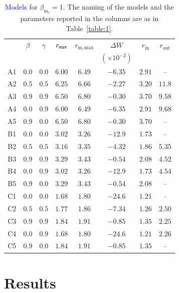 \documentclass{aa}
\newcommand{\sg}[1]{\textcolor{blue}{#1}}
\begin{document}
\begin{table}
\caption{\sg{Models} for $\beta_{\mathrm{m}_{\mathrm{c}}} = 1$. The naming of the models and the parameters reported in the columns are as in Table~\ref{table:1}.}             
\label{table:2}      
\centering          
\begin{tabular}{c c c c  c c c c}
\hline\hline       
 & $\beta$ & $\gamma$ & $r_{\rm{max}}$ &  $r_{\mathrm{m, max}}$ & $\Delta W$               & $r_{\mathrm{in}}$ & $r_{\mathrm{out}}$ \\ 
 &              &                   &                          &                                        & $(\times 10^{-2})$     &                              &  \\
\hline           
A1 & $0.0$ & $0.0$ & $6.00$ &  $6.49$  & $-6.35$ & $2.91$ & -- \\ 
A2 & $0.5$ & $0.5$ & $6.25$ &  $6.66$  & $-2.27$ & $3.20$ & $11.8$\\ 
A3 & $0.9$ & $0.9$ & $6.50$ &  $6.80$  & $-0.30$ & $3.70$ &  $9.58$\\ 
A4 & $0.0$ & $0.9$ & $6.00$ &  $6.49$  & $-6.35$ & $2.91$ & $9.68$\\ 
A5 & $0.9$ & $0.0$ & $6.50$ &  $6.80$  & $-0.30$ & $3.70$ & --\\ 
 \hline 
B1 & $0.0$ & $0.0$ & $3.02$ &  $3.26$  & $-12.9$ & $1.73$ & -- \\ 
B2 & $0.5$ & $0.5$ & $3.16$ &  $3.35$  & $-4.32$ & $1.86$ & $5.35$\\
B3 & $0.9$ & $0.9$ & $3.29$ &  $3.43$  & $-0.54$ & $2.08$ & $4.52$\\ 
B4 & $0.0$ & $0.9$ & $3.02$ &  $3.26$  & $-12.9$ & $1.73$ & $4.54$\\  
B5 & $0.9$ & $0.0$ & $3.29$ &  $3.43$  & $-0.54$ & $2.08$ & -- \\ 
 \hline 
C1 & $0.0$ & $0.0$ & $1.68$ &  $1.80$  & $-24.6$ & $1.21$ & -- \\ 
C2 & $0.5$ & $0.5$ & $1.77$ &  $1.86$  & $-7.34$ & $1.26$ & $2.50$\\  
C3 & $0.9$ & $0.9$ & $1.84$ &  $1.91$  & $-0.85$ & $1.35$ & $2.25$\\ 
C4 & $0.0$ & $0.9$ & $1.68$ &  $1.80$  & $-24.6$ & $1.21$ & $2.26$\\ 
C5 & $0.9$ & $0.0$ & $1.84$ &  $1.91$  & $-0.85$ & $1.35$ & --\\ 
\hline      
\end{tabular}
\end{table}

\section{Results}
\label{results}
\end{document}
